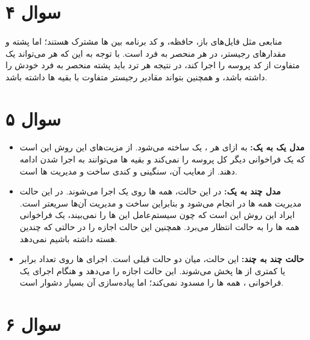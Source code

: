 \documentclass{article}
\begin{document}
	\section*{سوال ۴}
	\paragraph*{}
	منابعی مثل فایل‌های باز، حافظه، و کد برنامه بین
	ها
	مشترک هستند؛ اما پشته و مقدارهای رجیستر، در هر
	منحصر به فرد است. با توجه به این که هر
	می‌تواند یک
	متفاوت از کد پروسه را اجرا کند، در نتیجه هر ترد باید پشته منحصر به فرد خودش را داشته باشد، و همچنین بتواند مقادیر رجیستر متفاوت با بقیه
	ها
	داشته باشد.

	\section*{سوال ۵}
	\begin{itemize}
		\item{\textbf{
			مدل یک به یک:
		}}
		به ازای هر
		،
		یک
		ساخته می‌شود. از مزیت‌های این روش این است که یک فراخوانی
		دیگر کل پروسه را
		نمی‌کند و بقیه
		ها
		می‌توانند به اجرا شدن ادامه دهند. از معایب آن، سنگینی و کندی ساخت و مدیریت
		ها است.

		\item{\textbf{
			مدل چند به یک:
		}}
		در این حالت، همه
		ها روی یک
		اجرا می‌شوند. در این حالت مدیریت همه
		ها
		در
		انجام می‌شود و بنابراین ساخت و مدیریت آن‌ها سریعتر است. ایراد این روش این است که چون سیستم‌عامل این
		ها
		را نمی‌بیند، یک فراخوانی
		همه
		ها
		را به حالت انتظار می‌برد. همچنین این حالت اجازه
		را در حالتی که چندین هسته داشته باشیم نمی‌دهد.

		\item{\textbf{
			حالت چند به چند:
		}}
		این حالت، میان دو حالت قبلی است. اجرای
		ها
		روی تعداد برابر یا کمتری از
		ها
		پخش می‌شوند. این حالت اجازه
		را می‌دهد و هنگام اجرای یک فراخوانی
		،
		همه
		ها
		را مسدود نمی‌کند؛ اما پیاده‌سازی آن بسیار دشوار است.

	\end{itemize}


	\section*{سوال ۶}
\end{document}
